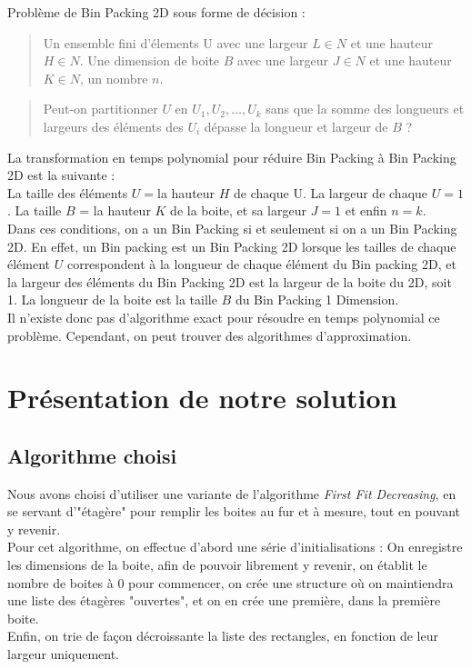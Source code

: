 \documentclass[12pt]{article}
\begin{document}
Problème de Bin Packing 2D sous forme de décision : \\
   \begin{quote}
Un ensemble fini d’élements U avec une largeur $L \in N$ et une hauteur $H \in N$. Une dimension de boite $B$ avec une largeur $J \in N$ et une hauteur $K \in N$, un nombre $n$.  \end{quote}
   \begin{quote}
 Peut-on partitionner  $U$ en $U_1, U_2, ..., U_k$ sans que la somme des longueurs et largeurs des éléments des $U_i$ dépasse la longueur et largeur de $B$ ?  \end{quote}
 
La transformation en temps polynomial pour réduire Bin Packing à Bin Packing 2D est la suivante : \\
La taille des éléments $U = $la hauteur $H$ de chaque U. La largeur de chaque $U = 1$. La taille $B$ = la hauteur $K$ de la boite, et sa largeur $J = 1$ et enfin $n=k$. \\ 
Dans ces conditions, on a un Bin Packing si et seulement si on a un Bin Packing 2D. En effet, un Bin packing est un Bin Packing 2D lorsque les tailles de chaque élément $U$ correspondent à la longueur de chaque élément du Bin packing 2D, et la largeur des éléments du Bin Packing 2D est la largeur de la boite du 2D, soit 1. La longueur de la boite est la taille $B$ du Bin Packing 1 Dimension. \\
Il n'existe donc pas d'algorithme exact pour résoudre en temps polynomial ce problème. Cependant, on peut trouver des algorithmes d'approximation. 

\newpage
\section{Présentation de notre solution}
\subsection*{Algorithme choisi}
Nous avons choisi d'utiliser une variante de l'algorithme \emph{First Fit Decreasing}, en se servant d'"étagère" pour remplir les boites au fur et à mesure, tout en pouvant y revenir. \\
Pour cet algorithme, on effectue d'abord une série d'initialisations : On enregistre les dimensions de la boite, afin de pouvoir librement y revenir, on établit le nombre de boites à 0 pour commencer, on crée une structure où on maintiendra une liste des étagères "ouvertes", et on en crée une première, dans la première boite. \\
Enfin, on trie de façon décroissante la liste des rectangles, en fonction de leur largeur uniquement. \\
\end{document}
